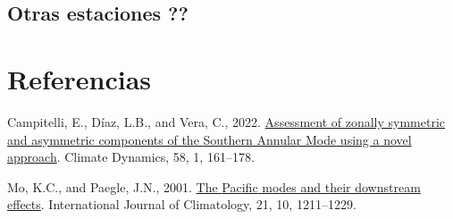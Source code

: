 \documentclass[12pt,oneside]{reedthesis}
\newlength{\cslhangindent}
\newenvironment{CSLReferences}[2] %
 {%
  \setlength{\parindent}{0pt}
  \ifodd #1 \everypar{\setlength{\hangindent}{\cslhangindent}}\ignorespaces\fi
  \ifnum #2 > 0
  \setlength{\parskip}{#2\baselineskip}
  \fi
 }%
 {}
\begin{document}
\hypertarget{otras-estaciones-1}{%
\section{Otras estaciones ??}\label{otras-estaciones-1}}

\backmatter

\hypertarget{referencias}{%
\chapter*{Referencias}\label{referencias}}


\noindent

\setlength{\parindent}{-0.20in}

\hypertarget{refs}{}
\begin{CSLReferences}{1}{0}
\leavevmode{}%
Campitelli, E., Díaz, L.B., and Vera, C., 2022. \href{https://doi.org/10.1007/s00382-021-05896-5}{Assessment of zonally symmetric and asymmetric components of the {Southern Annular Mode} using a novel approach}. Climate Dynamics, 58, 1, 161--178.

\leavevmode{}%
Mo, K.C., and Paegle, J.N., 2001. \href{https://doi.org/10.1002/joc.685}{The {Pacific} modes and their downstream effects}. International Journal of Climatology, 21, 10, 1211--1229.

\end{CSLReferences}

\end{document}
